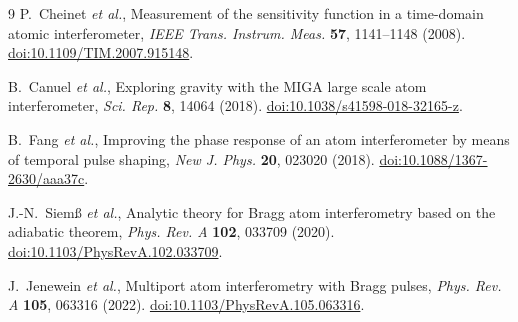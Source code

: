 \documentclass[11pt,a4paper]{article}
\begin{document}
\footnotesize
\begin{thebibliography}{9}
\setlength{\itemsep}{0pt}
P.~Cheinet \textit{et al.}, Measurement of the sensitivity function in a time-domain atomic interferometer, \textit{IEEE Trans. Instrum. Meas.} \textbf{57}, 1141--1148 (2008). \href{https://doi.org/10.1109/TIM.2007.915148}{doi:10.1109/TIM.2007.915148}.

B.~Canuel \textit{et al.}, Exploring gravity with the MIGA large scale atom interferometer, \textit{Sci. Rep.} \textbf{8}, 14064 (2018). \href{https://doi.org/10.1038/s41598-018-32165-z}{doi:10.1038/s41598-018-32165-z}.

B.~Fang \textit{et al.}, Improving the phase response of an atom interferometer by means of temporal pulse shaping, \textit{New J. Phys.} \textbf{20}, 023020 (2018). \href{https://doi.org/10.1088/1367-2630/aaa37c}{doi:10.1088/1367-2630/aaa37c}.

J.-N.~Siem\ss{} \textit{et al.}, Analytic theory for Bragg atom interferometry based on the adiabatic theorem, \textit{Phys. Rev. A} \textbf{102}, 033709 (2020). \href{https://doi.org/10.1103/PhysRevA.102.033709}{doi:10.1103/PhysRevA.102.033709}.

J.~Jenewein \textit{et al.}, Multiport atom interferometry with Bragg pulses, \textit{Phys. Rev. A} \textbf{105}, 063316 (2022). \href{https://doi.org/10.1103/PhysRevA.105.063316}{doi:10.1103/PhysRevA.105.063316}.
\end{thebibliography}
\end{document}
